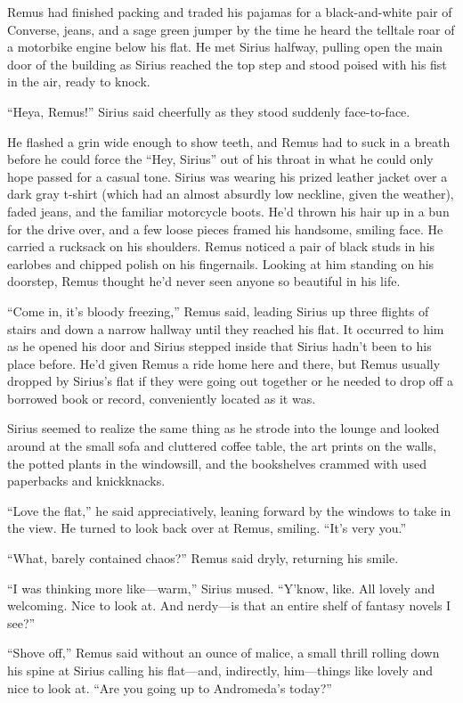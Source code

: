Remus had finished packing and traded his pajamas for a black-and-white pair of Converse, jeans, and a sage green jumper by the time he heard the telltale roar of a motorbike engine below his flat. He met Sirius halfway, pulling open the main door of the building as Sirius reached the top step and stood poised with his fist in the air, ready to knock.

“Heya, Remus!” Sirius said cheerfully as they stood suddenly face-to-face.

He flashed a grin wide enough to show teeth, and Remus had to suck in a breath before he could force the “Hey, Sirius” out of his throat in what he could only hope passed for a casual tone. Sirius was wearing his prized leather jacket over a dark gray t-shirt (which had an almost absurdly low neckline, given the weather), faded jeans, and the familiar motorcycle boots. He’d thrown his hair up in a bun for the drive over, and a few loose pieces framed his handsome, smiling face. He carried a rucksack on his shoulders. Remus noticed a pair of black studs in his earlobes and chipped polish on his fingernails. Looking at him standing on his doorstep, Remus thought he’d never seen anyone so beautiful in his life.

“Come in, it’s bloody freezing,” Remus said, leading Sirius up three flights of stairs and down a narrow hallway until they reached his flat. It occurred to him as he opened his door and Sirius stepped inside that Sirius hadn’t been to his place before. He’d given Remus a ride home here and there, but Remus usually dropped by Sirius’s flat if they were going out together or he needed to drop off a borrowed book or record, conveniently located as it was.

Sirius seemed to realize the same thing as he strode into the lounge and looked around at the small sofa and cluttered coffee table, the art prints on the walls, the potted plants in the windowsill, and the bookshelves crammed with used paperbacks and knickknacks.

“Love the flat,” he said appreciatively, leaning forward by the windows to take in the view. He turned to look back over at Remus, smiling. “It’s very you.”

“What, barely contained chaos?” Remus said dryly, returning his smile.

“I was thinking more like—warm,” Sirius mused. “Y’know, like. All lovely and welcoming. Nice to look at. And nerdy—is that an entire shelf of fantasy novels I see?”

“Shove off,” Remus said without an ounce of malice, a small thrill rolling down his spine at Sirius calling his flat—and, indirectly, him—things like lovely and nice to look at. “Are you going up to Andromeda’s today?”

